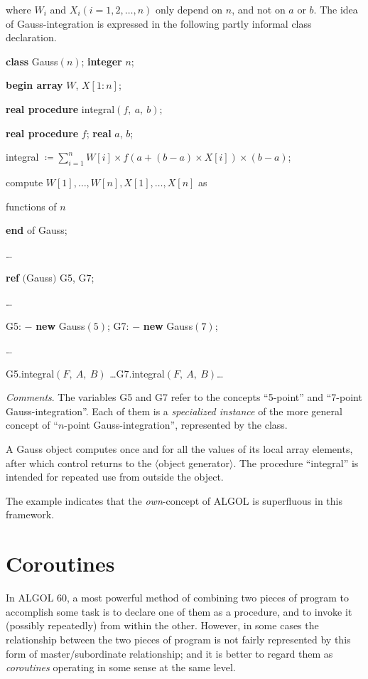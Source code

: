 \documentclass[twoside,11pt]{book}
\begin{document}
\noindent
where $W_i$ and $X_i(i = 1, 2, \dots, n)$ only depend on $n$, and not on $a$ or $b$. The idea of Gauss-integration is expressed in the following partly informal class declaration.

\quad \textbf{class} Gauss$(n)$; \textbf{integer} $n$;

\quad \textbf{begin array} $W$, $X[1:n]$;

\quad \quad \textbf{real procedure} integral$(f,\ a,\ b)$;

\quad \quad \textbf{real procedure} $f$; \textbf{real} $a$, $b$;

\quad \quad integral $\coloneq \sum_{i=1}^n W[i] \times f(a + (b - a)\times X[i])\times (b- a)$;

\quad \quad compute $W[1], \dots, W[n], X[1], \dots, X[n]$ as

\quad \quad functions of $n$

\quad \textbf{end} of Gauss;

\quad \dots

\quad \textbf{ref} $($Gauss$)$ G5, G7;

\quad \dots

\quad G5: $-$ \textbf{new} Gauss$(5)$; G7: $-$ \textbf{new} Gauss$(7)$;

\quad \dots

\quad G5.integral$(F,\ A,\ B)$ \dots G7.integral$(F,\ A,\ B)$\dots

\noindent
\textit{Comments}. The variables G5 and G7 refer to the concepts ``5-point'' and ``7-point Gauss-integration''. Each of them is a \textit{specialized instance} of the
more general concept of ``$n$-point Gauss-integration'', represented by the class.

A Gauss object computes once and for all the values of its local array elements, after which control returns to the $\langle$object generator$\rangle$. The procedure ``integral'' is intended for repeated use from outside the object.

The example indicates that the \textit{own}-concept of ALGOL is superfluous in this framework.

\section{Coroutines}

In ALGOL 60, a most powerful method of combining two pieces of program to accomplish some task is to declare one of them as a procedure, and to invoke it (possibly repeatedly) from within the other. However, in some cases the relationship between the two pieces of program is not fairly represented by this form of master$/$subordinate relationship; and it is better to regard them as \textit{coroutines} operating in some sense at the same level.
\end{document}
